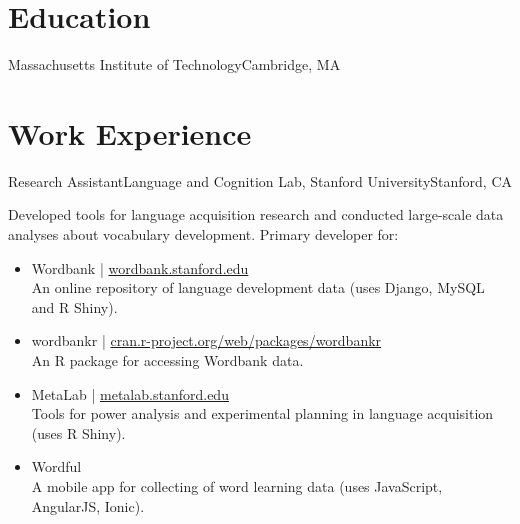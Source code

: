 \documentclass[11pt,letter]{moderncv}
\begin{document}
\makecvtitle

\vspace*{-2\baselineskip}

\section{Education}

{Massachusetts Institute of Technology}{Cambridge, MA}{}{}


\vspace*{0.25em}

\section{Work Experience}


{Research Assistant}{Language and Cognition Lab, Stanford University}{Stanford, CA}{}{
%
Developed tools for language acquisition research and conducted large-scale data analyses about vocabulary development. Primary developer for:
\begin{itemize}
\item Wordbank | \url{wordbank.stanford.edu}\\An online repository of language development data (uses Django, MySQL and R Shiny).
\item wordbankr | \url{cran.r-project.org/web/packages/wordbankr}\\An R package for accessing Wordbank data.
\item MetaLab | \url{metalab.stanford.edu}\\Tools for power analysis and experimental planning in language acquisition (uses R Shiny).
\item Wordful\\A mobile app for collecting of word learning data (uses JavaScript, AngularJS, Ionic).
\end{itemize}
%
}
\vspace*{0.2em}
\end{document}
